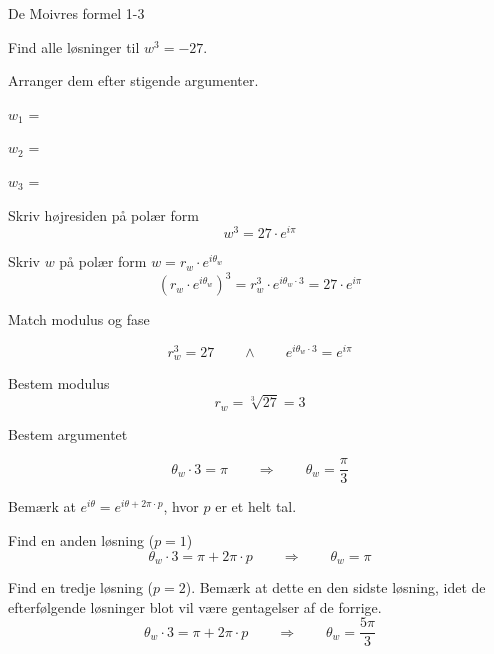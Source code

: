 \documentclass{article}
\begin{document}
\begin{exercise}{De Moivres formel 1-3}

Find alle løsninger til $w^3=-27$. 

Arranger dem efter stigende argumenter.

$w_1$ = 		

$w_2$ = 		

$w_3$ = 	


\hint 

Skriv højresiden på polær form
\[
w^3 = 27 \cdot e^{i \pi}
\]


\hint

Skriv $w$ på polær form $w = r_w \cdot e^{i \theta_w}$
\[
\left(r_w \cdot e^{i \theta_w}\right)^3 = r_w^3 \cdot e^{i \theta_w \cdot 3} = 27 \cdot e^{i \pi}
\]

\hint 
Match modulus og fase

\[
r_w^3 = 27 \qquad \wedge \qquad e^{i \theta_w \cdot 3} = e^{i \pi}
\]

\hint

Bestem modulus
\[
r_w  =  \sqrt[3]{27} = 3
\]

\hint

Bestem argumentet

\[
\theta_w \cdot 3 = \pi \qquad \Rightarrow \qquad  \theta_w = \frac{\pi}{3}
\]

\hint

Bemærk at $e^{i \theta} = e^{i \theta + 2 \pi \cdot p}$, hvor $p$ er et helt tal.

\hint

Find en anden løsning ($p=1$)
\[
\theta_w \cdot 3 = \pi  + 2 \pi \cdot p \qquad \Rightarrow \qquad  \theta_w = \pi
\]

\hint

Find en tredje løsning ($p=2$). 
Bemærk at dette en den sidste løsning, idet de efterfølgende 
løsninger blot vil være gentagelser af de forrige.
\[
\theta_w \cdot 3 = \pi  + 2 \pi \cdot p \qquad \Rightarrow  \qquad  \theta_w = \frac{5 \pi}{3}
\]


\end{exercise}

\newpage
\end{document}
